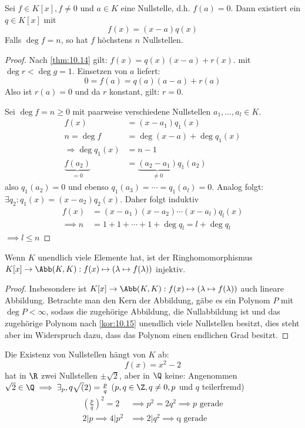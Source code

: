 \documentclass[a4paper, 10pt]{scrbook}
\begin{document}
\begin{kor}
\label{kor:10.15}
Sei $f\in K[x], f\neq 0$ und $a\in K$ eine Nullstelle, d.h. $f(a)=0$.
Dann existiert ein $q\in K[x]$ mit
\[
f(x) = (x-a)q(x)
\]
Falls $\deg f= n$, so hat $f$ höchstens $n$ Nullstellen.
\begin{proof}
Nach \ref{thm:10.14} gilt: $f(x)=q(x)(x-a)+r(x)$.
mit $\deg r < \deg g = 1$.
Einsetzen von $a$ liefert:
\[
0=f(a)=q(a)(a-a)+r(a)
\]
Also ist $r(a)=0$ und da $r$ konstant, gilt: $r=0$.

Sei $\deg f=n\ge 0$ mit paarweise verschiedene Nullstellen $a_1,\dotsc,a_l\in K$.
\begin{align*}
f(x)&=(x-a_1)q_1(x)\\
n= \deg f &= \deg(x-a) +\deg q_1(x)\\
\Rightarrow \deg q_1(x) &=n-1\\
\underbrace{f (a_2)}_{=0} &=\underbrace{(a_2-a_1)}_{\neq 0}q_1(a_2)
\end{align*}
also $q_1(a_2) = 0$ und ebenso $q_1(a_3)=\dotsb=q_1(a_l)=0$.
Analog folgt: $\exists{q_2}: q_1(x)=(x-a_2) q_2(x)$.
Daher folgt induktiv
\begin{align*}
f(x)&=(x-a_1)(x-a_2)\dotsb (x-a_l)q_l(x)\\
\implies n &= 1 + 1 +\dotsb + 1 + \deg q_l=l+ \deg q_l
\end{align*}
$\implies l\le n$
\end{proof}
\end{kor}

\begin{note} Wenn $K$ unendlich viele Elemente hat, 
ist der Ringhomomorphismus $K[x]\to \Abb(K,K) : f(x)\mapsto (\lambda \mapsto f(\lambda))$ injektiv.

\begin{proof}
Insbesondere ist $K[x]\to \Abb(K,K) : f(x)\mapsto (\lambda \mapsto f(\lambda))$ auch lineare Abbildung.
Betrachte man den Kern der Abbildung, gäbe es ein Polynom $P$ mit $\deg P<\infty$, sodass die zugehörige Abbildung, die 
Nullabbildung ist und das zugehörige Polynom nach \ref{kor:10.15} unendlich viele Nullstellen besitzt, dies steht aber im 
Widerspruch dazu, dass das Polynom einen endlichen Grad besitzt.
\end{proof}
\end{note}

Die Existenz von Nullstellen hängt von $K$ ab:
\[
f(x)=x^2-2
\]
hat in $\R$ zwei Nullstellen $\pm \sqrt{2}$, aber in $\Q$ keine:
Angenommen $\sqrt 2\in \Q \implies \exists_p,q \sqrt(2)=\frac{p}{q}$ ($p, q \in \Z, q \neq 0, p$ und $q$ teilerfremd)
\begin{align*}
\left(\frac pq\right)^2=2
&\implies p^2=2q^2
\implies p \text{ gerade}\\
2 | p \implies 4 | p^2
&\implies 2 | q^2
\implies \text{q gerade}
\end{align*}
\end{document}
